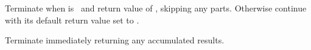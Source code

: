 \begin{LIST}{1cm}
\begin{LIST}{.5cm}
    {
    Terminate  when  is \T\ and return value of
    , skipping any  parts. Otherwise continue
     with its default return value set to \NIL. 
    }

    {
    Terminate  immediately returning any accumulated results.
    }
  \end{LIST}
\end{LIST}




